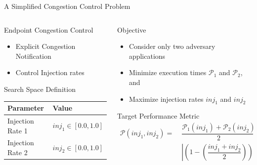\documentclass[10pt, compress, aspectratio=169, xcolor={table,usenames,dvipsnames}]{beamer}
\begin{document}
\begin{frame}[label={sec:orge5fff58}]{A Simplified Congestion Control Problem}
\begin{columns}
\begin{column}{0.5\columnwidth}
\begin{block}{Endpoint Congestion Control}
\begin{itemize}
\item Explicit Congestion Notification
\item Control Injection rates
\end{itemize}
\begin{block}{Search Space Definition}
\begin{center}
\begin{tabular}{ll}
\toprule
Parameter & Value\\
\midrule
Injection Rate 1 & \(inj_1 \in [0.0, 1.0]\)\\
Injection Rate 2 & \(inj_2 \in [0.0, 1.0]\)\\
\bottomrule
\end{tabular}
\end{center}
\end{block}
\end{block}
\end{column}
\begin{column}{0.5\columnwidth}
\begin{block}{Objective}
\begin{itemize}
\item Consider only two adversary applications
\item \alert{Minimize} execution times \(\mathcal{P}_1\) and \(\mathcal{P}_2\), and
\item \alert{Maximize} injection rates \(inj_1\) and \(inj_2\)
\end{itemize}
\begin{block}{Target Performance Metric}
\begin{align*}
  \mathcal{P}(inj_1,inj_2) =
  \; & \dfrac{\mathcal{P}_1(inj_1) + \mathcal{P}_2(inj_2)}{2} + \\
  \; & \left|\left(1  -  \left(\dfrac{inj_1  + inj_2}{2}\right)\right)\right|
\end{align*}
\end{block}
\end{block}
\end{column}
\end{columns}
\end{frame}
\end{document}
